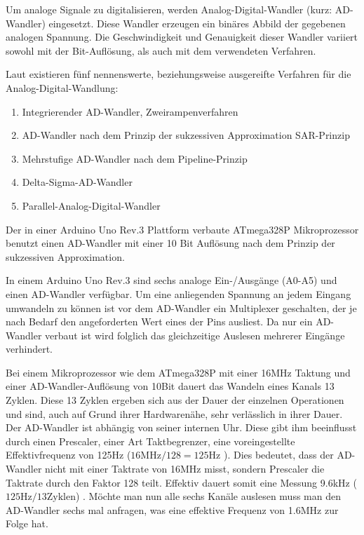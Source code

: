 Um analoge Signale zu digitalisieren, werden Analog-Digital-Wandler (kurz: AD-Wandler) eingesetzt. Diese Wandler erzeugen ein binäres Abbild der gegebenen analogen Spannung. Die Geschwindigkeit und Genauigkeit dieser Wandler variiert sowohl mit der Bit-Auflösung, als auch mit dem verwendeten Verfahren.

Laut \cite{hering_elektronik_2014} existieren fünf nennenswerte, beziehungsweise ausgereifte Verfahren für die Analog-Digital-Wandlung:
\begin{enumerate}
 \item Integrierender AD-Wandler, Zweirampenverfahren
 \item AD-Wandler nach dem Prinzip der sukzessiven Approximation SAR-Prinzip
 \item Mehrstufige AD-Wandler nach dem Pipeline-Prinzip
 \item Delta-Sigma-AD-Wandler
 \item Parallel-Analog-Digital-Wandler
\end{enumerate}

Der in einer Arduino Uno Rev.3 Plattform verbaute ATmega328P Mikroprozessor\cite{_arduino_2015} benutzt einen AD-Wandler mit einer 10 Bit Auflösung nach dem Prinzip der sukzessiven Approximation\cite{atmel_corporation_atmega48a/pa/88a/pa/168a/pa/328/p_2014}\cite{yates_arduinos_2014}. 

In einem Arduino Uno Rev.3 sind sechs analoge Ein-/Ausgänge (A0-A5)\cite{_arduino_2015} und einen AD-Wandler\cite{atmel_corporation_atmega48a/pa/88a/pa/168a/pa/328/p_2014} verfügbar. Um eine anliegenden Spannung an jedem Eingang umwandeln zu können ist vor dem AD-Wandler ein Multiplexer geschalten, der je nach Bedarf den angeforderten Wert eines der Pins ausliest. Da nur ein AD-Wandler verbaut ist wird folglich das gleichzeitige Auslesen mehrerer Eingänge verhindert.

Bei einem Mikroprozessor wie dem ATmega328P mit einer 16MHz Taktung und einer AD-Wandler-Auflösung von 10Bit dauert das Wandeln eines Kanals 13 Zyklen. Diese 13 Zyklen ergeben sich aus der Dauer der einzelnen Operationen und sind, auch auf Grund ihrer Hardwarenähe, sehr verlässlich in ihrer Dauer\cite{atmel_corporation_atmega48a/pa/88a/pa/168a/pa/328/p_2014}.
Der AD-Wandler ist abhängig von seiner internen Uhr. Diese gibt ihm beeinflusst durch einen Prescaler, einer Art Taktbegrenzer, eine voreingestellte Effektivfrequenz von 125Hz ($16\text{MHz} / 128 = 125\text{Hz}$ ). Dies bedeutet, dass der AD-Wandler nicht mit einer Taktrate von 16MHz misst, sondern Prescaler die Taktrate durch den Faktor 128 teilt.
Effektiv dauert somit eine Messung 9.6kHz ($125\text{Hz} / 13\text{Zyklen}$) . Möchte man nun alle sechs Kanäle auslesen muss man den AD-Wandler sechs mal anfragen, was eine effektive Frequenz von 1.6MHz zur Folge hat.

